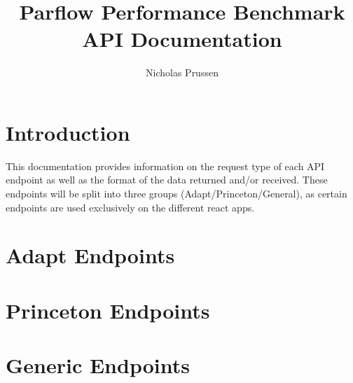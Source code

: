 \documentclass[12pt,runningheads]{article}
\begin{document}
\title{Parflow Performance Benchmark API Documentation}
\author{Nicholas Prussen}
\maketitle
\newpage

\tableofcontents

\newpage

\section{Introduction}
This documentation provides information on the request type of each API endpoint as well as the format of the data returned and/or received. These endpoints will be split into three groups (Adapt/Princeton/General), as certain endpoints are used exclusively on the different react apps.


\section{Adapt Endpoints}








\section{Princeton Endpoints}



\section{Generic Endpoints}




\newpage
\end{document}
